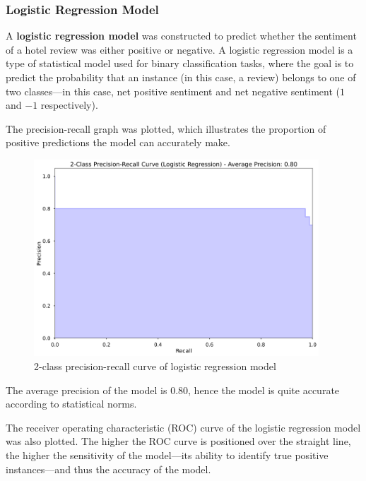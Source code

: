 \documentclass[12pt, bibliography=totocnumbered, a4paper]{scrartcl}
\def\bf#1{\textbf{#1}}
\begin{document}
\subsubsection{Logistic Regression Model}
A \bf{logistic regression model} was constructed to predict whether the sentiment
of a hotel review was either positive or negative. A logistic regression model
is a type of statistical model used for binary classification tasks, where the goal
is to predict the probability that an instance (in this case, a review) belongs to one of two classes---in
this case, net positive sentiment and net negative sentiment (\(1\) and \(-1\) respectively).

The precision-recall graph was plotted, which illustrates the proportion of positive
predictions the model can accurately make.

\begin{figure}[htpb]
	\begin{center}
		\includegraphics[width=0.95\textwidth]{../results/rq3/prec-recall_logreg.png}
	\end{center}
	\caption{2-class precision-recall curve of logistic regression model}
	\label{fig:lg-prcurve}
\end{figure}

The average precision of the model is \(0.80\), hence the model is quite accurate
according to statistical norms.

The receiver operating characteristic (ROC) curve of the logistic regression model
was also plotted. The higher the ROC curve is positioned over the straight line, the higher
the sensitivity of the model---its ability to identify true positive instances---and
thus the accuracy of the model.
\end{document}
